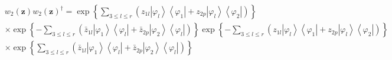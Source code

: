 \documentclass[aps,preprint]{revtex4}%
\begin{document}
\begin{align}
& w_{2}\left(  \mathbf{z}\right)  w_{2}\left(  \mathbf{z}\right)  ^{\dagger
}=\exp\left\{  \sum_{3\leq l\leq r}\left(  z_{1l}\left\vert \varphi
_{l}\right\rangle \left\langle \varphi_{1}\right\vert +z_{2p}\left\vert
\varphi_{l}\right\rangle \left\langle \varphi_{2}\right\vert \right)
\right\}  \\
& \times\exp\left\{  -\sum_{3\leq l\leq r}\left(  \bar{z}_{1l}\left\vert
\varphi_{1}\right\rangle \left\langle \varphi_{l}\right\vert +\bar{z}%
_{2p}\left\vert \varphi_{2}\right\rangle \left\langle \varphi_{l}\right\vert
\right)  \right\}  \exp\left\{  -\sum_{3\leq l\leq r}\left(  z_{1l}\left\vert
\varphi_{l}\right\rangle \left\langle \varphi_{1}\right\vert +z_{2p}\left\vert
\varphi_{l}\right\rangle \left\langle \varphi_{2}\right\vert \right)
\right\}  \\
& \times\exp\left\{  \sum_{3\leq l\leq r}\left(  \bar{z}_{1l}\left\vert
\varphi_{1}\right\rangle \left\langle \varphi_{l}\right\vert +\bar{z}%
_{2p}\left\vert \varphi_{2}\right\rangle \left\langle \varphi_{l}\right\vert
\right)  \right\}
\end{align}
\end{document}
